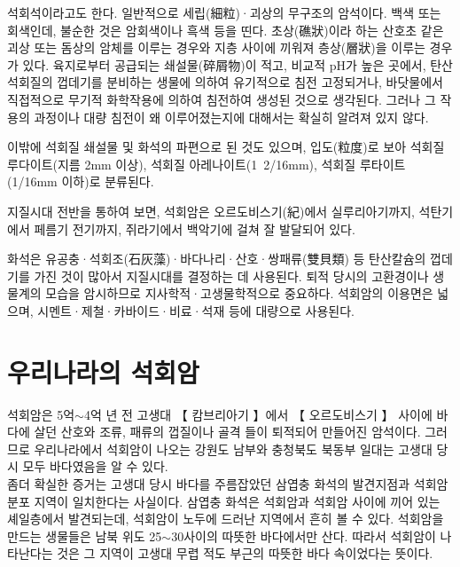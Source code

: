 \documentclass[12pt, a4paper, twoside]{book}
\begin{document}
				석회석이라고도 한다. 일반적으로 세립(細粒)·괴상의 무구조의 암석이다. 
				백색 또는 회색인데, 불순한 것은 암회색이나 흑색 등을 띤다. 
				초상(礁狀)이라 하는 산호초 같은 괴상 또는 돔상의 암체를 이루는 경우와 지층 사이에 끼워져 층상(層狀)을 이루는 경우가 있다. 
				육지로부터 공급되는 쇄설물(碎屑物)이 적고, 비교적 pH가 높은 곳에서, 탄산석회질의 껍데기를 분비하는 생물에 의하여 유기적으로 침전 고정되거나, 바닷물에서 직접적으로 무기적 화학작용에 의하여 침전하여 생성된 것으로 생각된다. 
				그러나 그 작용의 과정이나 대량 침전이 왜 이루어졌는지에 대해서는 확실히 알려져 있지 않다.
				
				이밖에 석회질 쇄설물 및 화석의 파편으로 된 것도 있으며, 입도(粒度)로 보아 석회질 루다이트(지름 2mm 이상), 석회질 아레나이트(1~2/16mm), 석회질 루타이트(1/16mm 이하)로 분류된다. 
				
				지질시대 전반을 통하여 보면, 석회암은 오르도비스기(紀)에서 실루리아기까지, 석탄기에서 페름기 전기까지, 쥐라기에서 백악기에 걸쳐 잘 발달되어 있다. 
				
				화석은 유공충·석회조(石灰藻)·바다나리·산호·쌍패류(雙貝類) 등 탄산칼슘의 껍데기를 가진 것이 많아서 지질시대를 결정하는 데 사용된다. 
				퇴적 당시의 고환경이나 생물계의 모습을 암시하므로 지사학적·고생물학적으로 중요하다. 석회암의 이용면은 넓으며, 시멘트·제철·카바이드·비료·석재 등에 대량으로 사용된다. 




	\clearpage
	\section{우리나라의 석회암}

				석회암은 5억$\sim$4억 년 전 고생대 【 캄브리아기 】에서 【 오르도비스기 】 사이에 바다에 살던 산호와 조류, 패류의 껍질이나 골격 들이 퇴적되어 만들어진 암석이다. 
				그러므로 우리나라에서 석회암이 나오는 강원도 남부와 충청북도 북동부 일대는 고생대 당시 모두 바다였음을 알 수 있다. \\
				

				좀더 확실한 증거는 고생대 당시 바다를 주름잡았던 삼엽충 화석의 발견지점과 석회암 분포 지역이 일치한다는 사실이다. 
				삼엽충 화석은 석회암과 석회암 사이에 끼어 있는 셰일층에서 발견되는데, 석회암이 노두에 드러난 지역에서 흔히 볼 수 있다. 
				석회암을 만드는 생물들은 남북 위도 25$\sim$30사이의 따뜻한 바다에서만 산다. 따라서 석회암이 나타난다는 것은 그 지역이 고생대 무렵 적도 부근의 따뜻한 바다 속이었다는 뜻이다.  \\
				
\end{document}
